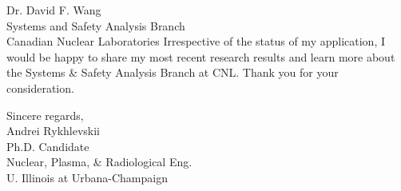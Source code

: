 \documentclass[11pt]{letter} %
\newcommand{\RecipientName}{Dr. David F. Wang\xspace}
\newcommand{\RecipientAddress}{Systems and Safety Analysis Branch \\
Canadian Nuclear Laboratories}
\begin{document}
\begin{letter}{\RecipientName\\
        \RecipientAddress\xspace}
Irrespective of the status of my application, I would be happy to share my 
most recent research results and learn more about the Systems \& Safety 
Analysis Branch at CNL. Thank you for your consideration.

\closing{Sincere regards,\\
{Andrei Rykhlevskii\\
Ph.D. Candidate\\
Nuclear, Plasma, \& Radiological Eng.\\
U. Illinois at Urbana-Champaign}
}


\end{letter}
\end{document}
